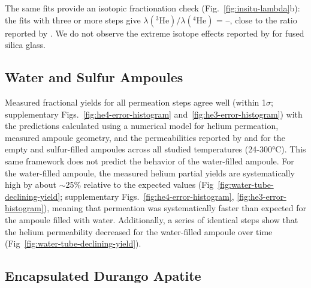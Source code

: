 The same fits provide an isotopic fractionation check (Fig.~\ref{fig:insitu-lambda}b): the fits with three or more steps give \(\lambda(^{3}\mathrm{He})/\lambda(^{4}\mathrm{He})\) = \PaperRatioMin--\PaperRatioMax, close to the ratio reported by \citet{jones1953}. We do not observe the extreme isotope effects reported by \citet{mcmurtry2019} for fused silica glass.

\subsection{Water and Sulfur Ampoules}\label{sec:results-water-sulfur}

Measured fractional yields for all permeation steps agree well (within 1$\sigma$; supplementary Figs.~\ref{fig:he4-error-histogram} and~\ref{fig:he3-error-histogram}) with the predictions calculated using a numerical model for helium permeation, measured ampoule geometry, and the permeabilities reported by \citet{swets1961} and \citet{jones1953} for the empty and sulfur-filled ampoules across all studied temperatures (24-300°C). This same framework does not predict the behavior of the water-filled ampoule.
For the water-filled ampoule, the measured helium partial yields are systematically high by about $\sim$25\% relative to the expected values (Fig~\ref{fig:water-tube-declining-yield}; supplementary Figs.~\ref{fig:he4-error-histogram}, \ref{fig:he3-error-histogram}), meaning that permeation was systematically faster than expected for the ampoule filled with water. Additionally, a series of identical steps show that the helium permeability decreased for the water-filled ampoule over time (Fig~\ref{fig:water-tube-declining-yield}). 

\subsection{Encapsulated Durango Apatite}\label{sec:results-durango}

